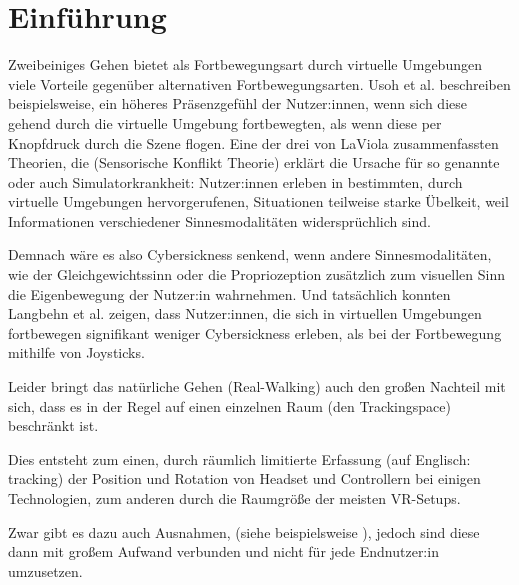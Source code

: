 
\chapter{Einführung}\label{chapter:intro}

Zweibeiniges Gehen bietet als Fortbewegungsart durch virtuelle Umgebungen viele Vorteile gegenüber alternativen Fortbewegungsarten. Usoh et al. \cite{usoh-vergleich-1999} beschreiben beispielsweise, ein höheres Präsenzgefühl der Nutzer:innen, wenn sich diese gehend durch die virtuelle Umgebung fortbewegten, als wenn diese per Knopfdruck durch die Szene flogen.
Eine der drei von LaViola \cite{cybersickness} zusammenfassten Theorien, die  (Sensorische Konflikt Theorie) erklärt die Ursache für so genannte  oder auch Simulatorkrankheit: Nutzer:innen erleben in bestimmten, durch virtuelle Umgebungen hervorgerufenen, Situationen teilweise starke Übelkeit, weil Informationen verschiedener Sinnesmodalitäten widersprüchlich sind.

Demnach wäre es also Cybersickness senkend, wenn andere Sinnesmodalitäten, wie der Gleichgewichtssinn oder die Propriozeption zusätzlich zum visuellen Sinn die Eigenbewegung der Nutzer:in wahrnehmen. Und tatsächlich konnten Langbehn et al. \cite{langbehn-vergleich-2018} zeigen, dass Nutzer:innen, die sich in virtuellen Umgebungen fortbewegen signifikant weniger Cybersickness erleben, als bei der Fortbewegung mithilfe von Joysticks.

Leider bringt das natürliche Gehen (Real-Walking) auch den großen Nachteil mit sich, dass es in der Regel auf einen einzelnen Raum (den Trackingspace) beschränkt ist.

Dies entsteht zum einen, durch räumlich limitierte Erfassung (auf Englisch: tracking) der Position und Rotation von Headset und Controllern bei einigen Technologien, zum anderen durch die Raumgröße der meisten VR-Setups.

Zwar gibt es dazu auch Ausnahmen, (siehe beispielsweise \cite{microsoft}), jedoch sind diese dann mit großem Aufwand verbunden und nicht für jede Endnutzer:in umzusetzen.

